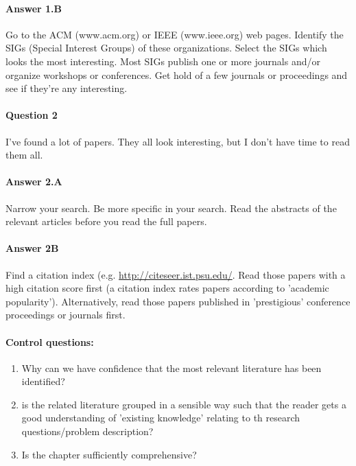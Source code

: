 \paragraph{Answer 1.B}  Go to the ACM (www.acm.org) or IEEE (www.ieee.org) web pages.
Identify the SIGs (Special Interest Groups) of these organizations.
Select the SIGs which looks the most interesting.
Most SIGs publish one or more journals and/or organize workshops or conferences.
Get hold of a few journals or proceedings and see if they're any interesting.


\paragraph{Question 2}  I've found a lot of papers.
They all look interesting, but I don't have time to read them all.

\paragraph{Answer 2.A}  Narrow your search.  Be more specific in your search.  Read the abstracts of the relevant articles before you read the full papers.

\paragraph{Answer 2B}  Find a citation index (e.g. \url{http://citeseer.ist.psu.edu/}.
Read those papers with a high citation score first
(a citation index rates papers according to 'academic popularity').  Alternatively,
read those papers published in 'prestigious' conference proceedings or journals first.


\paragraph{Control questions:}
\begin{enumerate}
\item Why can we have confidence that the most relevant literature has been identified?
\item is the related literature grouped in a sensible way such that the reader gets a good understanding of 'existing knowledge' relating to th research questions/problem description?
\item Is the chapter sufficiently comprehensive?
\end{enumerate}